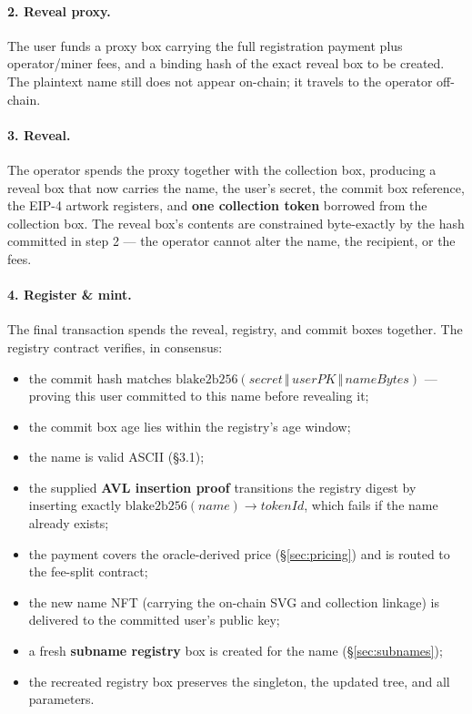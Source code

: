 \documentclass[11pt]{article}
\begin{document}
\paragraph{2. Reveal proxy.}
The user funds a proxy box carrying the full registration payment plus
operator/miner fees, and a binding hash of the exact reveal box to be
created. The plaintext name still does not appear on-chain; it travels to the
operator off-chain.

\paragraph{3. Reveal.}
The operator spends the proxy together with the collection box, producing a
reveal box that now carries the name, the user's secret, the commit box
reference, the EIP-4 artwork registers, and \textbf{one collection token}
borrowed from the collection box. The reveal box's contents are constrained
byte-exactly by the hash committed in step 2 --- the operator cannot alter
the name, the recipient, or the fees.

\paragraph{4. Register \& mint.}
The final transaction spends the reveal, registry, and commit boxes together.
The registry contract verifies, in consensus:

\begin{itemize}
  \item the commit hash matches
        $\mathrm{blake2b256}(\mathit{secret} \,\Vert\, \mathit{userPK}
        \,\Vert\, \mathit{nameBytes})$ --- proving this user committed to this
        name before revealing it;
  \item the commit box age lies within the registry's age window;
  \item the name is valid ASCII (\S3.1);
  \item the supplied \textbf{AVL insertion proof} transitions the registry
        digest by inserting exactly
        $\mathrm{blake2b256}(\mathit{name}) \rightarrow \mathit{tokenId}$,
        which fails if the name already exists;
  \item the payment covers the oracle-derived price
        (\S\ref{sec:pricing}) and is routed to the fee-split contract;
  \item the new name NFT (carrying the on-chain SVG and collection linkage)
        is delivered to the committed user's public key;
  \item a fresh \textbf{subname registry} box is created for the name
        (\S\ref{sec:subnames});
  \item the recreated registry box preserves the singleton, the updated tree,
        and all parameters.
\end{itemize}
\end{document}
